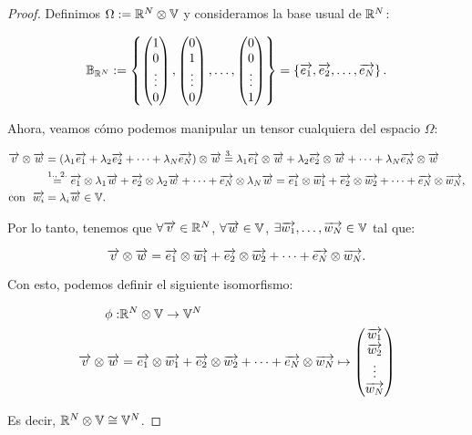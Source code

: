 \begin{proof}
    Definimos $\Omega := \mathbb{R}^N \otimes \mathbb{V}$ y consideramos la base usual de $\mathbb{R}^N$:

    $$\mathbb{B}_{\mathbb{R}^N} := \left\{\begin{pmatrix} 1 \\ 0 \\ \vdots \\ 0 \end{pmatrix}, \begin{pmatrix} 0 \\ 1 \\ \vdots \\ 0 \end{pmatrix}, \ldots, \begin{pmatrix} 0 \\ 0 \\ \vdots \\ 1 \end{pmatrix} \right\} = \left\{\overrightarrow{e_1}, \overrightarrow{e_2}, \ldots, \overrightarrow{e_N} \right\}.$$

    Ahora, veamos cómo podemos manipular un tensor cualquiera del espacio $\Omega$:

    \begin{equation}
        \begin{split}
            \overrightarrow{v} \otimes \overrightarrow{w} &= (\lambda_1 \overrightarrow{e_1} + \lambda_2 \overrightarrow{e_2} + \cdots + \lambda_N \overrightarrow{e_N}) \otimes \overrightarrow{w} \stackrel{\text{3.}}{=} \lambda_1 \overrightarrow{e_1} \otimes \overrightarrow{w} + \lambda_2 \overrightarrow{e_2} \otimes \overrightarrow{w} + \cdots + \lambda_N \overrightarrow{e_N} \otimes \overrightarrow{w} \\
            & \stackrel{\text{1., 2.}}{=} \overrightarrow{e_1} \otimes \lambda_1 \overrightarrow{w} + \overrightarrow{e_2} \otimes \lambda_2 \overrightarrow{w} + \cdots + \overrightarrow{e_N} \otimes \lambda_N \overrightarrow{w} = \overrightarrow{e_1} \otimes \overrightarrow{w_1} + \overrightarrow{e_2} \otimes \overrightarrow{w_2} + \dots + \overrightarrow{e_N} \otimes \overrightarrow{w_N}, \\
            \text{con} \ \  \overrightarrow{w_i} &= \lambda_i \overrightarrow{w} \in \mathbb{V}.
        \end{split}
    \end{equation}

    Por lo tanto, tenemos que $\forall \overrightarrow{v} \in \mathbb{R}^N$, $\forall \overrightarrow{w} \in \mathbb{V}$, $\exists \overrightarrow{w_1}, \ldots, \overrightarrow{w_N} \in \mathbb{V}$ tal que:

    $$\overrightarrow{v} \otimes \overrightarrow{w} = \overrightarrow{e_1} \otimes \overrightarrow{w_1} + \overrightarrow{e_2} \otimes \overrightarrow{w_2} + \cdots + \overrightarrow{e_N} \otimes \overrightarrow{w_N}.$$

    Con esto, podemos definir el siguiente isomorfismo:

    \begin{equation}
        \begin{split}
            \phi: & \mathbb{R}^N \otimes \mathbb{V} \to \mathbb{V}^N \\
            \overrightarrow{v} \otimes \overrightarrow{w} &= \overrightarrow{e_1} \otimes \overrightarrow{w_1} + \overrightarrow{e_2} \otimes \overrightarrow{w_2} + \cdots + \overrightarrow{e_N} \otimes \overrightarrow{w_N} \mapsto \begin{pmatrix} \overrightarrow{w_1} \\ \overrightarrow{w_2} \\ \vdots \\ \overrightarrow{w_N} \end{pmatrix}
        \end{split}
    \end{equation}

    Es decir, $\mathbb{R}^N \otimes \mathbb{V} \cong \mathbb{V}^N$.

\end{proof}

